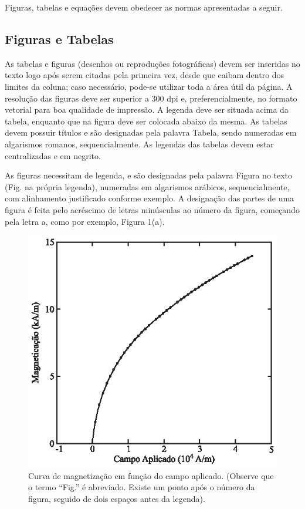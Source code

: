 \documentclass[portugues]{sobraep}
\begin{document}
Figuras, tabelas e equações devem obedecer as normas apresentadas a seguir.

\subsection{Figuras e Tabelas}

As tabelas e figuras (desenhos ou reproduções fotográficas) devem ser inseridas no texto logo após serem citadas pela primeira vez, desde que caibam dentro dos limites da coluna; caso necessário, pode-se utilizar toda a área útil da página. A resolução das figuras deve ser superior a 300 dpi e, preferencialmente, no formato vetorial para boa qualidade de impressão. A legenda deve ser situada acima da tabela, enquanto que na figura deve ser colocada abaixo da mesma. As tabelas devem possuir títulos e são designadas pela palavra Tabela, sendo numeradas em algarismos romanos, sequencialmente. As legendas das tabelas devem estar centralizadas e em negrito.

As figuras necessitam de legenda, e são designadas pela palavra Figura no texto (Fig. na própria legenda), numeradas em algarismos arábicos, sequencialmente, com alinhamento justificado conforme exemplo. A designação das partes de uma figura é feita pelo acréscimo de letras minúsculas ao número da figura, começando pela letra a, como por exemplo, Figura 1(a).


\begin{figure}[H]
	\includegraphics[scale=1]{figura.eps}
	\centering
	\caption{Curva de magnetização em função do campo aplicado. (Observe que o termo ``Fig.'' é abreviado. Existe um ponto após o número da figura, seguido de dois espaços antes da legenda).}
	\label{fig:fig1}
\end{figure}
\end{document}

